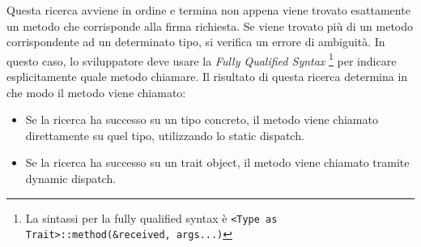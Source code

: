 Questa ricerca avviene in ordine e termina non appena viene trovato esattamente un metodo che corrisponde alla firma richiesta. Se viene trovato più di un metodo corrispondente ad un determinato tipo, si verifica un errore di ambiguità. In questo caso, lo sviluppatore deve usare la \textit{Fully Qualified Syntax} \footnote{La sintassi per la fully qualified syntax è \texttt{<Type as Trait>::method(\&received, args...)}} per indicare esplicitamente quale metodo chiamare. Il risultato di questa ricerca determina in che modo il metodo viene chiamato:
\begin{itemize}
    \item Se la ricerca ha successo su un tipo concreto, il metodo viene chiamato direttamente su quel tipo, utilizzando lo static dispatch.
    \item Se la ricerca ha successo su un trait object, il metodo viene chiamato tramite dynamic dispatch. 
\end{itemize}
